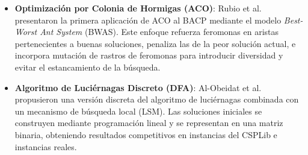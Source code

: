 \documentclass[letter, 10pt]{article}
\begin{document}
\begin{itemize}
    \item \textbf{Optimizaci\'on por Colonia de Hormigas (ACO)}: 
    Rubio et al.~\cite{rubio2013} presentaron la primera aplicaci\'on 
    de ACO al BACP mediante el modelo \textit{Best-Worst Ant System} 
    (BWAS). Este enfoque refuerza feromonas en aristas pertenecientes 
    a buenas soluciones, penaliza las de la peor soluci\'on actual, 
    e incorpora mutaci\'on de rastros de feromonas para introducir 
    diversidad y evitar el estancamiento de la b\'usqueda.
    
    \item \textbf{Algoritmo de Luci\'ernagas Discreto (DFA)}: 
    Al-Obeidat et al.~\cite{Firefly2023} propusieron una versi\'on 
    discreta del algoritmo de luci\'ernagas combinada con un mecanismo 
    de b\'usqueda local (LSM). Las soluciones iniciales se construyen 
    mediante programaci\'on lineal y se representan en una matriz 
    binaria, obteniendo resultados competitivos en instancias del 
    CSPLib e instancias reales.

\end{itemize}
\end{document}
